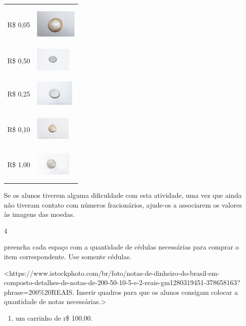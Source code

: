\begin{longtable}[]{@{}ll@{}}
\toprule
R\$ 0,05 &
\includegraphics[width=0.80577in,height=0.79447in]{media/image60.jpg}\tabularnewline
R\$ 0,50 &
\includegraphics[width=0.69145in,height=0.53632in]{media/image61.jpg}\tabularnewline
R\$ 0,25 &
\includegraphics[width=0.75523in,height=0.67928in]{media/image62.jpg}\tabularnewline
R\$ 0,10 &
\includegraphics[width=0.67617in,height=0.63139in]{media/image63.jpg}\tabularnewline
R\$ 1,00 &
\includegraphics[width=0.69044in,height=0.66964in]{media/image64.jpg}\tabularnewline
\bottomrule
\end{longtable}

Se os alunos tiverem alguma dificuldade com esta atividade,
uma vez que ainda não tiveram contato com números fracionários, ajude-os
a associarem os valores às imagens das moedas.

\num{4}

preencha cada espaço com a quantidade de cédulas necessárias para comprar o item correspondente. Use somente cédulas.

\textless{}https://www.istockphoto.com/br/foto/notas-de-dinheiro-do-brasil-em-composto-detalhes-de-notas-de-200-50-10-5-e-2-reais-gm1280319451-378658163?phrase=200\%20REAIS.
Inserir quadros para que os alunos consigam colocar a quantidade de
notas necessárias.\textgreater{}

\begin{enumerate}
\def\labelenumi{\Alph{enumi})}
\item
  um carrinho de r\$ 100,00.
\end{enumerate}

